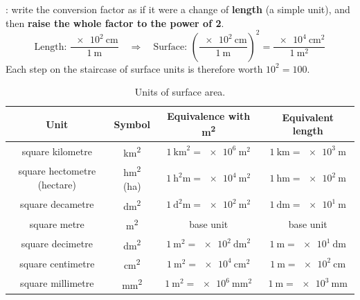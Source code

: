 \begin{impt}
    : write the conversion factor as if it were a change of \textbf{length} (a simple unit), and then \textbf{raise the whole factor to the power of 2}.
    \begin{equation*}
        \text{Length: } \dfrac{\qty{e2}{\cm}}{\qty{1}{\m}}
        \quad\Longrightarrow\quad
        \text{Surface: } \left(\dfrac{\qty{e2}{\cm}}{\qty{1}{\m}}\right)^{2} = \dfrac{\qty{e4}{\square\cm}}{\qty{1}{\square\m}}
    \end{equation*}
    Each step on the staircase of surface units is therefore worth \(10^{2} = 100\).
\end{impt}

\begin{table}[H]
    \centering
    \small
    \renewcommand{\arraystretch}{1.3}
    \begin{tabular}{cccc}
        \toprule
        \textbf{Unit} & \textbf{Symbol} & \textbf{Equivalence with \unit{\square\m}} & \textbf{Equivalent length} \\
        \midrule
        square kilometre & \unit{\square\km} & \(\qty{1}{\square\km} = \qty{e6}{\square\m}\) & \(\qty{1}{\km} = \qty{e3}{\m}\) \\
        square hectometre (hectare) & \unit{\square\hecto\m} (\unit{\hectare}) & \(\qty{1}{\square\hecto\m} = \qty{e4}{\square\m}\) & \(\qty{1}{\hecto\m} = \qty{e2}{\m}\) \\
        square decametre & \unit{\square\deca\m} & \(\qty{1}{\square\deca\m} = \qty{e2}{\square\m}\) & \(\qty{1}{\deca\m} = \qty{e1}{\m}\) \\
        \midrule
        square metre & \unit{\square\m} & base unit & base unit \\
        \midrule
        square decimetre & \unit{\square\dm} & \(\qty{1}{\square\m} = \qty{e2}{\square\dm}\) & \(\qty{1}{\m} = \qty{e1}{\dm}\) \\
        square centimetre & \unit{\square\cm} & \(\qty{1}{\square\m} = \qty{e4}{\square\cm}\) & \(\qty{1}{\m} = \qty{e2}{\cm}\) \\
        square millimetre & \unit{\square\mm} & \(\qty{1}{\square\m} = \qty{e6}{\square\mm}\) & \(\qty{1}{\m} = \qty{e3}{\mm}\) \\
        \bottomrule
    \end{tabular}
    \caption{Units of surface area.}
    \label{tab:u1_surface_units}
\end{table}

